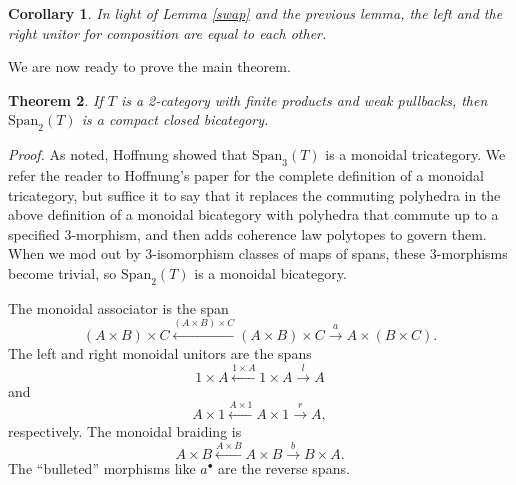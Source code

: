 \documentclass{article}
\newtheorem{thm}{Theorem}
\newcommand{\Span}{\mbox{Span}}
\newtheorem{cor}[thm]{Corollary}
\begin{document}
\begin{cor}
  In light of Lemma \ref{swap} and the previous lemma, the left and the right unitor for composition are equal to each other.
\end{cor}
\fi %

We are now ready to prove the main theorem.

\begin{thm}
  \label{Span2}
  If $T$ is a 2-category with finite products and weak pullbacks, then $\Span_2(T)$ is a compact closed bicategory.
\end{thm}
{\em Proof.} As noted, Hoffnung \cite{Hoffnung} showed that $\Span_3(T)$
is a monoidal tricategory.  We refer the reader to Hoffnung's paper for the complete definition of a monoidal tricategory, but suffice it to say that it replaces the commuting polyhedra in the above definition of a monoidal bicategory with polyhedra that commute up to a specified 3-morphism, and then adds coherence law polytopes to govern them.  When we mod out by 3-isomorphism classes of maps of spans, these 3-morphisms become trivial, so $\Span_2(T)$ is a monoidal bicategory.

The monoidal associator is the span $$(A\times B)\times C \stackrel{(A\times B)\times C}{\leftarrow} (A\times B)\times C \stackrel{a}{\to} A\times (B\times C).$$  The left and right monoidal unitors are the spans $$1\times A \stackrel{1\times A}{\leftarrow} 1\times A \stackrel{l}{\to} A$$ and $$A\times 1 \stackrel{A\times 1}{\leftarrow} A\times 1 \stackrel{r}{\to} A,$$ respectively.  The monoidal braiding is $$A\times B \stackrel{A\times B}{\leftarrow} A\times B \stackrel{b}{\to} B\times A.$$   The ``bulleted'' morphisms like $a^\bullet$ are the reverse spans.
\end{document}
